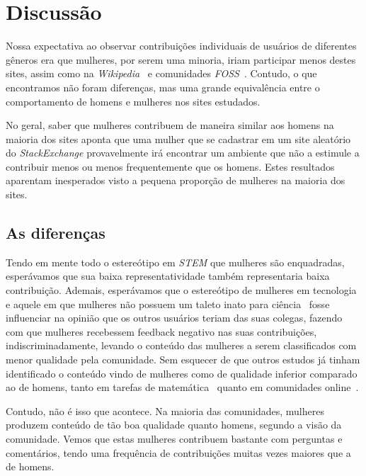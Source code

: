 \chapter{Discussão}
\label{ch:discussao}

Nossa expectativa ao observar contribuições individuais de usuários de diferentes gêneros era que mulheres, por serem uma minoria, iriam participar menos destes sites, assim como na \emph{Wikipedia}~\cite{antin2011gender} e comunidades \emph{FOSS}~\cite{rustad2011suck}. Contudo, o que encontramos não foram diferenças, mas uma grande equivalência entre o comportamento de homens e mulheres nos sites estudados. 

No geral, saber que mulheres contribuem de maneira similar aos homens na maioria dos sites aponta que uma mulher que se cadastrar em um site aleatório do \emph{StackExchange} provavelmente irá encontrar um ambiente que não a estimule a contribuir menos ou menos frequentemente que os homens. Estes resultados aparentam inesperados visto a pequena proporção de mulheres na maioria dos sites.

\section{As diferenças}

Tendo em mente todo o estereótipo em \emph{STEM} que mulheres são enquadradas, esperávamos que sua baixa representatividade também representaria baixa contribuição. Ademais, esperávamos que o estereótipo de mulheres em tecnologia~\cite{hyde1990gender} e aquele em que mulheres não possuem um taleto inato para ciência~\cite{leslie2015expectations} fosse influenciar na opinião que os outros usuários teriam das suas colegas, fazendo com que mulheres recebessem feedback negativo nas suas contribuições, indiscriminadamente, levando o conteúdo das mulheres a serem classificados com menor qualidade pela comunidade. Sem esquecer de que outros estudos já tinham identificado o conteúdo vindo de mulheres como de qualidade inferior comparado ao de homens, tanto em tarefas de matemática~\cite{campbell1986effects} quanto em comunidades online~\cite{collier2012conflict}.

Contudo, não é isso que acontece. Na maioria das comunidades, mulheres produzem conteúdo de tão boa qualidade quanto homens, segundo a visão da comunidade. Vemos que estas mulheres contribuem bastante com perguntas e comentários, tendo uma frequência de contribuições muitas vezes maiores que a de homens. 

